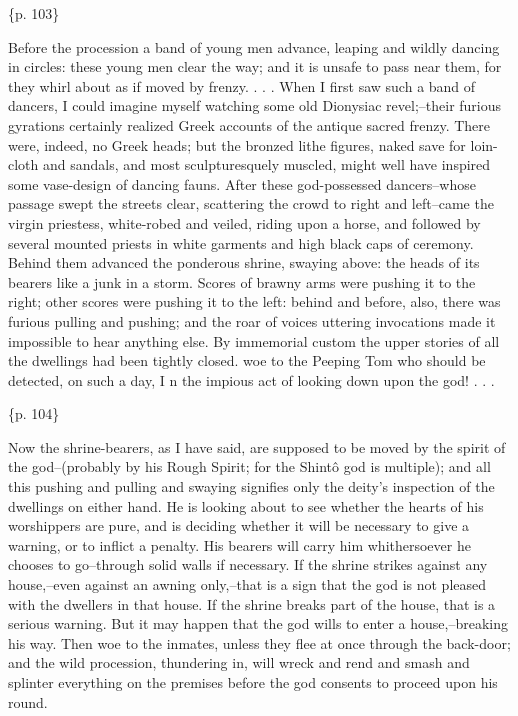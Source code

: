 \{p. 103\}

Before the procession a band of young men advance, leaping and wildly dancing in circles: these young men clear the way; and it is unsafe to pass near them, for they whirl about as if moved by frenzy. . . . When I first saw such a band of dancers, I could imagine myself watching some old Dionysiac revel;--their furious gyrations certainly realized Greek accounts of the antique sacred frenzy. There were, indeed, no Greek heads; but the bronzed lithe figures, naked save for loin-cloth and sandals, and most sculpturesquely muscled, might well have inspired some vase-design of dancing fauns. After these god-possessed dancers--whose passage swept the streets clear, scattering the crowd to right and left--came the virgin priestess, white-robed and veiled, riding upon a horse, and followed by several mounted priests in white garments and high black caps of ceremony. Behind them advanced the ponderous shrine, swaying above: the heads of its bearers like a junk in a storm. Scores of brawny arms were pushing it to the right; other scores were pushing it to the left: behind and before, also, there was furious pulling and pushing; and the roar of voices uttering invocations made it impossible to hear anything else. By immemorial custom the upper stories of all the dwellings had been tightly closed. woe to the Peeping Tom who should be detected, on such a day, I n the impious act of looking down upon the god! . . .

\{p. 104\}

Now the shrine-bearers, as I have said, are supposed to be moved by the spirit of the god--(probably by his Rough Spirit; for the Shintô god is multiple); and all this pushing and pulling and swaying signifies only the deity's inspection of the dwellings on either hand. He is looking about to see whether the hearts of his worshippers are pure, and is deciding whether it will be necessary to give a warning, or to inflict a penalty. His bearers will carry him whithersoever he chooses to go--through solid walls if necessary. If the shrine strikes against any house,--even against an awning only,--that is a sign that the god is not pleased with the dwellers in that house. If the shrine breaks part of the house, that is a serious warning. But it may happen that the god wills to enter a house,--breaking his way. Then woe to the inmates, unless they flee at once through the back-door; and the wild procession, thundering in, will wreck and rend and smash and splinter everything on the premises before the god consents to proceed upon his round.

